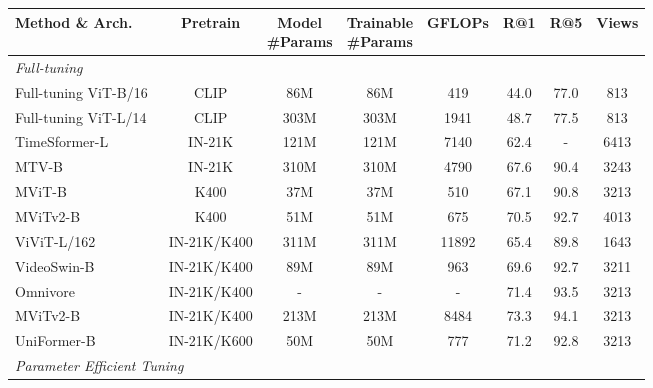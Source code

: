         \begin{table*}[t]
    \centering
    \small
    \setlength{\tabcolsep}{7pt}
        \begin{tabular}{lccccccc}
        \toprule
        Method \& Arch.   &   Pretrain    &  \makecell{Model \\ \#Params}   & \makecell{Trainable \\ \#Params}      & GFLOPs    & R@1 & R@5 &   Views  \\ 
        \midrule
        \multicolumn{5}{l}{\hspace{-5pt}\textit{Full-tuning}} \\
        \rowcolor{light_gray}
        Full-tuning ViT-B/16~\cite{vit}    &    CLIP    &       86M  &   86M  &   419 &   44.0   &   77.0   & 813    \\
        \rowcolor{light_gray}
        Full-tuning ViT-L/14~\cite{vit}    &    CLIP    &       303M  &   303M  &   1941 &   48.7   &   77.5   & 813    \\ 
        TimeSformer-L~\cite{space-time}           &    IN-21K   &   121M     &  121M  &     7140     &  62.4  & -    &   6413   \\
        MTV-B~\cite{multiview}           &    IN-21K   &   310M     &  310M  &     4790     &  67.6  & 90.4    &   3243   \\
        MViT-B~\cite{multiscale}           &    K400   &   37M     &  37M  &     510     &  67.1  & 90.8    &   3213   \\
        MViTv2-B~\cite{multiscale-v2}           &    K400   &   51M     &  51M  &     675     &  70.5  & 92.7    &   4013   \\
        ViViT-L/162~\cite{vivit}           &    IN-21K/K400   &   311M     &  311M  &     11892     &  65.4  & 89.8    &   1643 \\
        VideoSwin-B~\cite{video-swin}           &    IN-21K/K400   &   89M     &  89M  &     963     &  69.6  & 92.7    &   3211   \\
        Omnivore~\cite{omnivore}           &    IN-21K/K400   &   -     &  -  &     -     &  71.4  & 93.5    &   3213   \\
        MViTv2-B~\cite{multiscale-v2}           &    IN-21K/K400   &   213M     &  213M  &     8484     &  73.3  & 94.1    &   3213   \\
        UniFormer-B~\cite{uniformer}           &    IN-21K/K600   &   50M     &  50M  &     777     &  71.2  & 92.8    &   3213   \\ 
        \midrule
        \multicolumn{5}{l}{\hspace{-5pt}\textit{Parameter Efficient Tuning}} \\ 

\end{tabular}
\end{table*}
